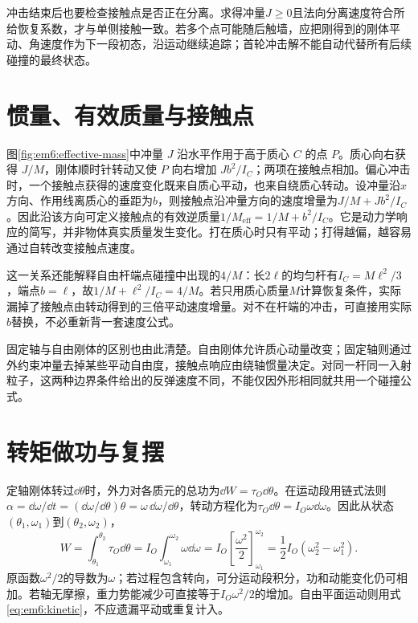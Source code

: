 冲击结束后也要检查接触点是否正在分离。求得冲量$J\ge0$且法向分离速度符合所给恢复系数，才与单侧接触一致。若多个点可能随后触墙，应把刚得到的刚体平动、角速度作为下一段初态，沿运动继续追踪；首轮冲击解不能自动代替所有后续碰撞的最终状态。

\section{惯量、有效质量与接触点}

图\ref{fig:em6:effective-mass}中冲量 $J$ 沿水平作用于高于质心 $C$ 的点 $P$。质心向右获得 $J/M$，刚体顺时针转动又使 $P$ 向右增加 $Jb^2/I_C$；两项在接触点相加。偏心冲击时，一个接触点获得的速度变化既来自质心平动，也来自绕质心转动。设冲量沿$x$方向、作用线离质心的垂距为$b$，则接触点沿冲量方向的速度增量为$J/M+Jb^2/I_C$。因此沿该方向可定义接触点的有效逆质量$1/M_{\mathrm{eff}}=1/M+b^2/I_C$。它是动力学响应的简写，并非物体真实质量发生变化。打在质心时只有平动；打得越偏，越容易通过自转改变接触点速度。


这一关系还能解释自由杆端点碰撞中出现的$4/M$：长$2\ell$的均匀杆有$I_C=M\ell^2/3$，端点$b=\ell$，故$1/M+\ell^2/I_C=4/M$。若只用质心质量$M$计算恢复条件，实际漏掉了接触点由转动得到的三倍平动速度增量。对不在杆端的冲击，可直接用实际$b$替换，不必重新背一套速度公式。

固定轴与自由刚体的区别也由此清楚。自由刚体允许质心动量改变；固定轴则通过外约束冲量去掉某些平动自由度，接触点响应由绕轴惯量决定。对同一杆同一入射粒子，这两种边界条件给出的反弹速度不同，不能仅因外形相同就共用一个碰撞公式。

\section{转矩做功与复摆}

定轴刚体转过$\dd\theta$时，外力对各质元的总功为$\dd W=\tau_O\dd\theta$。在运动段用链式法则$\alpha=\dd\omega/\dd t=(\dd\omega/\dd\theta)\dot\theta=\omega\,\dd\omega/\dd\theta$，转动方程化为$\tau_O\dd\theta=I_O\omega\dd\omega$。因此从状态$(\theta_1,\omega_1)$到$(\theta_2,\omega_2)$，
\[
 W=\int_{\theta_1}^{\theta_2}\tau_O\dd\theta
 =I_O\int_{\omega_1}^{\omega_2}\omega\dd\omega
 =I_O\left[\frac{\omega^2}{2}\right]_{\omega_1}^{\omega_2}
 =\frac12I_O(\omega_2^2-\omega_1^2).
\]
原函数$\omega^2/2$的导数为$\omega$；若过程包含转向，可分运动段积分，功和动能变化仍可相加。若轴无摩擦，重力势能减少可直接等于$I_O\omega^2/2$的增加。自由平面运动则用式\eqref{eq:em6:kinetic}，不应遗漏平动或重复计入。

